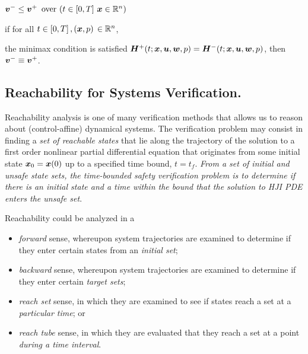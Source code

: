 %
\begin{corollary}
	\begin{inparaenum}[(i)]
		\item  $\bm{v}^- \le \bm{v}^+ \, \text{ over } (t\in \left[0,T\right]\, \bm{x} \in \mathbb{R}^n)$
		\item if for all $t\in \left[0,T\right], (\bm{x}, p) \, \in \mathbb{R}^n$,
	\end{inparaenum} 
	the minimax condition is satisfied \ie 	$\bm{H}^+(t; \bm{x}, \bm{u}, \bm{w}, p) = \bm{H}^-(t; \bm{x}, \bm{u}, \bm{w}, p)$, then
	$\bm{v}^- \equiv \bm{v}^+$.
\end{corollary}
%


\subsection{Reachability for Systems Verification.}
\noindent Reachability analysis is one of many verification methods that allows us to reason about (control-affine) dynamical systems. %
The verification problem may consist in finding a \textit{set of reachable states} that lie along the trajectory of the solution to a first order nonlinear partial differential equation that originates from some initial state $\bm{x}_0 = \bm{x}(0)$ up to a specified time bound, $t=t_f$. \textit{From a set of initial and unsafe state sets, the time-bounded safety verification problem is to determine if there is an initial state and a time within the bound that the solution to HJI PDE enters the unsafe set}.

Reachability could be analyzed in a 
%
\begin{itemize}%
	\item \textit{forward} sense, whereupon system trajectories are examined to determine if they enter certain states from an \textit{initial set};
	\item \textit{backward} sense, whereupon system trajectories are examined to determine if they enter certain \textit{target sets};
	\item \textit{reach set} sense, in which they are examined to see if states reach a set at a \textit{particular time}; or
	\item \textit{reach tube} sense, in which they are evaluated that they reach a set at a point \textit{during a time interval}.	
\end{itemize} 

